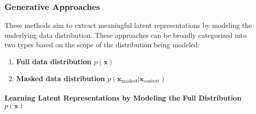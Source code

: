 \subsubsection{Generative Approaches}

These methods aim to extract meaningful latent representations by modeling the underlying data distribution. These approaches can be broadly categorized into two types based on the scope of the distribution being modeled:
\begin{enumerate}
    \item \textbf{Full data distribution $p(\textbf{x})$}
    \item \textbf{Masked data distribution $p(\mathbf{x}_{\text{masked}}|\textbf{x}_{\text{context}})$}
\end{enumerate}

\paragraph{Learning Latent Representations by Modeling the Full Distribution $p(\textbf{x})$}

